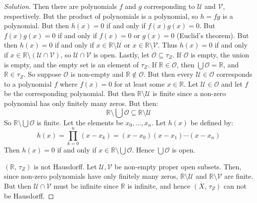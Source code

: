 \documentclass{article}
\theoremstyle{normal}
\begin{document}
\begin{proof}[Solution]
        Then there are polynomials $f$ and $g$ corresponding to $\mathcal{U}$
        and $\mathcal{V}$, respectively. But the product of polynomials is a
        polynomial, so $h=fg$ is a polynomial. But then $h(x)=0$ if and only if
        $f(x)g(x)=0$. But $f(x)g(x)=0$ if and only if $f(x)=0$ or $g(x)=0$
        (Euclid's theorem). But then $h(x)=0$ if and only if
        $x\in\mathbb{R}\setminus\mathcal{U}$ or
        $x\in\mathbb{R}\setminus\mathcal{V}$. Thus $h(x)=0$ if and only if
        $x\in\mathbb{R}\setminus(\mathcal{U}\cap\mathcal{V})$, so
        $\mathcal{U}\cap\mathcal{V}$ is open. Lastly, let
        $\mathcal{O}\subseteq\tau_{Z}$. If $\mathcal{O}$ is empty, the union
        is empty, and the empty set is an element of $\tau_{Z}$. If
        $\mathbb{R}\in\mathcal{O}$, then $\bigcup\mathcal{O}=\mathbb{R}$, and
        $\mathbb{R}\in\tau_{Z}$. So suppose $\mathcal{O}$ is non-empty and 
        $\mathbb{R}\notin\mathcal{O}$. But then every
        $\mathcal{U}\in\mathcal{O}$ corresponds to a polynomial $f$ where
        $f(x)=0$ for at least some $x\in\mathbb{R}$. Let
        $\mathcal{U}\in\mathcal{O}$ and let $f$ be the corresponding polynomial.
        But then $\mathbb{R}\setminus\mathcal{U}$ is finite since a non-zero
        polynomial has only finitely many zeros. But then:
        \begin{equation}
            \mathbb{R}\setminus\bigcup\mathcal{O}
            \subseteq\mathbb{R}\setminus\mathcal{U}
        \end{equation}
        So $\mathbb{R}\setminus\bigcup\mathcal{O}$ is finite. Let the elements
        be $x_{0},\dots,x_{n}$. Let $h(x)$ be defined by:
        \begin{equation}
            h(x)=\prod_{k=0}^{n}(x-x_{k})
            =(x-x_{0})(x-x_{1})\cdots(x-x_{n})
        \end{equation}
        Then $h(x)=0$ if and only if
        $x\in\mathbb{R}\setminus\bigcup\mathcal{O}$. Hence
        $\bigcup\mathcal{O}$ is open.
        \par\hfill\par
        $(\mathbb{R},\,\tau_{Z})$ is not Hausdorff. Let
        $\mathcal{U},\mathcal{V}$ be non-empty proper open subsets. Then,
        since non-zero polynomials have only finitely many zeros,
        $\mathbb{R}\setminus\mathcal{U}$ and $\mathbb{R}\setminus\mathcal{V}$
        are finite. But then $\mathcal{U}\cap\mathcal{V}$ must be infinite
        since $\mathbb{R}$ is infinite, and hence $(X,\,\tau_{Z})$ can not be
        Hausdorff.
    \end{proof}
\end{document}
